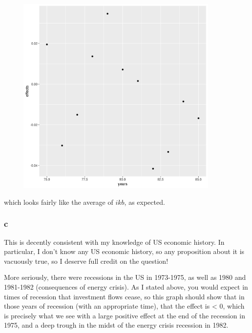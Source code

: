 \documentclass[12pt,letterpaper]{article}
\theoremstyle{definition}
\begin{document}
\begin{figure}[H]
  \begin{center}
    \includegraphics[width=10cm]{time.png}
  \end{center}
\end{figure}
which looks fairly like the average of $ikb$, as expected.

\subsubsection*{c}

This is decently consistent with my knowledge of US economic history. In particular, I don't know any US economic history, so any proposition about it is vacuously true, so I deserve full credit on the question!

More seriously, there were recessions in the US in 1973-1975, as well as 1980 and 1981-1982 (consequences of energy crisis). As I stated above, you would expect in times of recession that investment flows cease, so this graph should show that in those years of recession (with an appropriate time), that the effect is < 0, which is precisely what we see with a large positive effect at the end of the recession in 1975, and a deep trough in the midst of the energy crisis recession in 1982.
\end{document}
